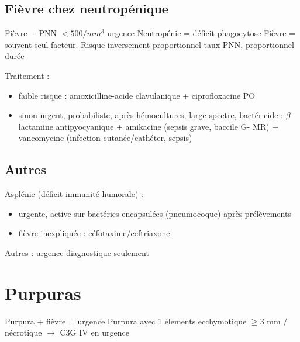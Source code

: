 \documentclass{article}
\newcommand*{\TakeFourierOrnament}[1]{{%
\fontencoding{U}\fontfamily{futs}\selectfont\char#1}}
\newcommand*{\danger}{\TakeFourierOrnament{66}}
\begin{document}
\subsection{Fièvre chez neutropénique}
\label{sec:org077134a}
Fièvre + PNN \(< 500/mm^3\) urgence \skull
Neutropénie = déficit phagocytose
Fièvre = souvent seul facteur.
Risque inversement proportionnel taux PNN, proportionnel durée

Traitement :
\begin{itemize}
\item faible risque : amoxicilline-acide clavulanique + ciprofloxacine PO
\item sinon urgent, probabiliste, après hémocultures, large spectre, bactéricide : \(\beta\)-lactamine antipyocyanique \(\pm\) amikacine (sepsis grave, baccile G- MR) \(\pm\) vancomycine (infection cutanée/cathéter, sepsis)
\end{itemize}


\subsection{Autres}
\label{sec:org8c06c0e}
Asplénie (déficit immunité humorale) : 
\begin{itemize}
\item urgente, active sur bactéries encapsulées (pneumocoque) après prélèvements
\item fièvre inexpliquée : céfotaxime/ceftriaxone
\end{itemize}
Autres : urgence diagnostique seulement

\section{Purpuras}
\label{sec:orga164eae}
\danger Purpura + fièvre = urgence 
\danger Purpura avec 1 élements ecchymotique $\ge 3$ mm / nécrotique $\to$ C3G
IV en urgence \skull
\end{document}
